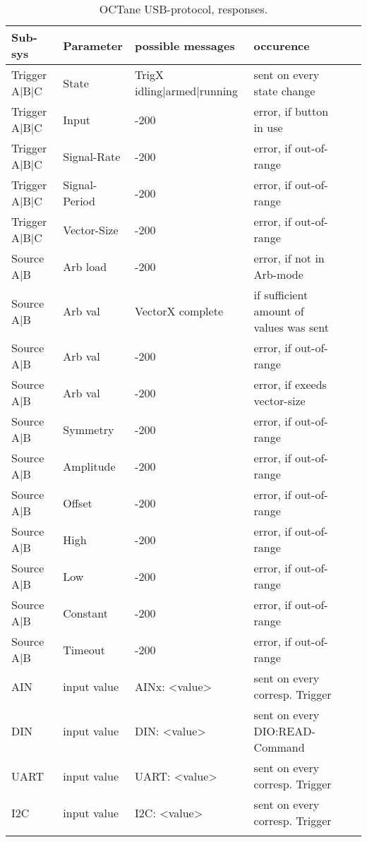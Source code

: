 			\centering
			\begin{longtable}{|l|l|l|l|l|l|}
			\hline


		Sub-sys					&  Parameter	 	& possible messages	& occurence 						& 			&  \\ \hline
		\redrow	Trigger A|B|C	&  State	 		& TrigX idling|armed|running& sent on every state change 		& 			& 	\\ \hline
				Trigger A|B|C 	& Input				& -200				& error, if button in use			& 			& 	\\ \hline
				Trigger A|B|C 	& Signal-Rate		& -200				& error, if out-of-range			& 			& 	\\ \hline
				Trigger A|B|C 	& Signal-Period		& -200				& error, if out-of-range			& 			& 	\\ \hline
				Trigger A|B|C 	& Vector-Size		& -200				& error, if out-of-range			& 			& 	\\ \hline
		\redrow	Source A|B		& Arb load	 		& -200				& error, if not in Arb-mode			& 			& 	\\ \hline
				Source A|B		& Arb val	 		& VectorX complete	& if sufficient amount of values was sent	& 			& 	\\ \hline
				Source A|B		& Arb val	 		& -200				& error, if out-of-range			& 			& 	\\ \hline
				Source A|B		& Arb val	 		& -200				& error, if exeeds vector-size		& 			& 	\\ \hline
				Source A|B		& Symmetry	 		& -200				& error, if out-of-range			& 			& 	\\ \hline
				Source A|B		& Amplitude			& -200				& error, if out-of-range			& 			& 	\\ \hline
				Source A|B		& Offset			& -200				& error, if out-of-range			& 			& 	\\ \hline
				Source A|B		& High				& -200				& error, if out-of-range			& 			& 	\\ \hline
				Source A|B		& Low				& -200				& error, if out-of-range			& 			& 	\\ \hline
				Source A|B		& Constant			& -200				& error, if out-of-range			& 			& 	\\ \hline
				Source A|B		& Timeout			& -200				& error, if out-of-range			& 			& 	\\ \hline

		\redrow	AIN 			& input value		& AINx: <value>		& sent on every corresp. Trigger	& 			& 	\\ \hline
				DIN 			& input value		& DIN: <value>		& sent on every DIO:READ-Command	& 			& 	\\ \hline
				UART 			& input value		& UART: <value>		& sent on every corresp. Trigger	& 			& 	\\ \hline
				I2C 			& input value		& I2C: <value>		& sent on every corresp. Trigger	& 			& 	\\ \hline
		\caption{OCTane USB-protocol, responses.}
		\label{USB-Protocol-responses}
		\end{longtable}
